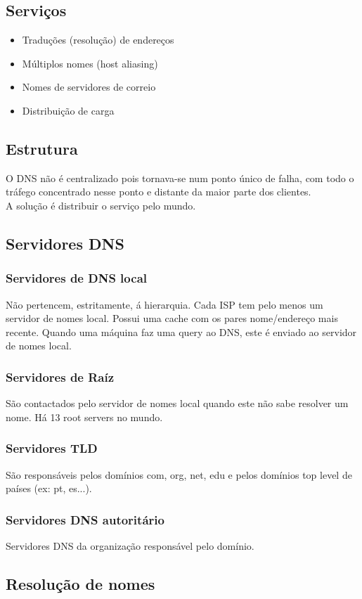 \documentclass[10pt,a4paper]{report}
\begin{document}
\subsection{Serviços}
\begin{itemize}
\item Traduções (resolução) de endereços
\item Múltiplos nomes (host aliasing)
\item Nomes de servidores de correio
\item Distribuição de carga
\end{itemize}
\subsection{Estrutura}
O DNS não é centralizado pois tornava-se num ponto único de falha, com todo o tráfego concentrado nesse ponto e distante da maior parte dos clientes.\\
A solução é distribuir o serviço pelo mundo.
\subsection{Servidores DNS}
\subsubsection{Servidores de DNS local}
Não pertencem, estritamente, á hierarquia. Cada ISP tem pelo menos um servidor de nomes local. Possui uma cache com os pares nome/endereço mais recente. Quando uma máquina faz uma query ao DNS, este é enviado ao servidor de nomes local.
\subsubsection{Servidores de Raíz}
São contactados pelo servidor de nomes local quando este não sabe resolver um nome. Há 13 root servers  no mundo.
\subsubsection{Servidores TLD}
São responsáveis pelos domínios com, org, net, edu e pelos domínios top level de países (ex: pt, es...).
\subsubsection{Servidores DNS autoritário}
Servidores DNS da organização responsável pelo domínio.
\subsection{Resolução de nomes}
\end{document}
